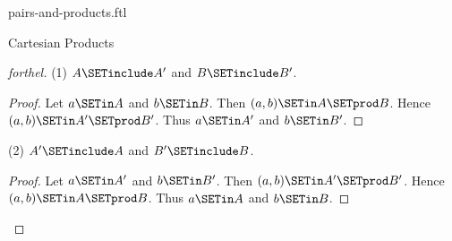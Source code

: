 \documentclass{stex}
\begin{document}
\begin{smodule}{pairs-and-products.ftl}
\begin{sfragment}{Cartesian Products}
\begin{proof}[forthel]
    (1) $A \SETinclude A'$ and $B \SETinclude B'$.
    \begin{proof}
      Let $a \SETin A$ and $b \SETin B$.
      Then $(a,b) \SETin A \SETprod B$.
      Hence $(a,b) \SETin A' \SETprod B'$.
      Thus $a \SETin A'$ and $b \SETin B'$.
    \end{proof}

    (2) $A' \SETinclude A$ and $B' \SETinclude B$.
    \begin{proof}
      Let $a \SETin A'$ and $b \SETin B'$.
      Then $(a,b) \SETin A' \SETprod B'$.
      Hence $(a,b) \SETin A \SETprod B$.
      Thus $a \SETin A$ and $b \SETin B$.
    \end{proof}
  \end{proof}
\end{sfragment}
\end{smodule}
\end{document}
